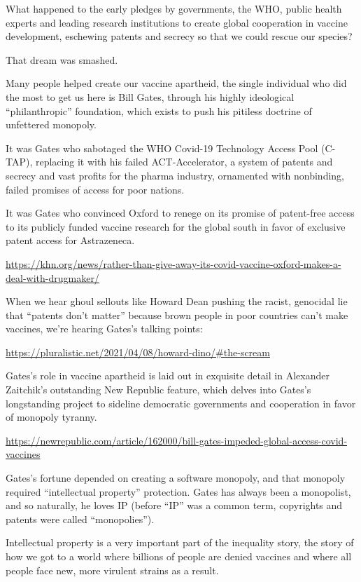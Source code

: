 \documentclass[
]{book}
\begin{document}
What happened to the early pledges by governments, the WHO, public health experts and leading research institutions to create global cooperation in vaccine development, eschewing patents and secrecy so that we could rescue our species?

That dream was smashed.

Many people helped create our vaccine apartheid, the single individual who did the most to get us here is Bill Gates, through his highly ideological ``philanthropic'' foundation, which exists to push his pitiless doctrine of unfettered monopoly.

It was Gates who sabotaged the WHO Covid-19 Technology Access Pool (C-TAP), replacing it with his failed ACT-Accelerator, a system of patents and secrecy and vast profits for the pharma industry, ornamented with nonbinding, failed promises of access for poor nations.

It was Gates who convinced Oxford to renege on its promise of patent-free access to its publicly funded vaccine research for the global south in favor of exclusive patent access for Astrazeneca.

\url{https://khn.org/news/rather-than-give-away-its-covid-vaccine-oxford-makes-a-deal-with-drugmaker/}

When we hear ghoul sellouts like Howard Dean pushing the racist, genocidal lie that ``patents don't matter'' because brown people in poor countries can't make vaccines, we're hearing Gates's talking points:

\url{https://pluralistic.net/2021/04/08/howard-dino/\#the-scream}

Gates's role in vaccine apartheid is laid out in exquisite detail in Alexander Zaitchik's outstanding New Republic feature, which delves into Gates's longstanding project to sideline democratic governments and cooperation in favor of monopoly tyranny.

\url{https://newrepublic.com/article/162000/bill-gates-impeded-global-access-covid-vaccines}

Gates's fortune depended on creating a software monopoly, and that monopoly required ``intellectual property'' protection. Gates has always been a monopolist, and so naturally, he loves IP (before ``IP'' was a common term, copyrights and patents were called ``monopolies'').

Intellectual property is a very important part of the inequality story, the story of how we got to a world where billions of people are denied vaccines and where all people face new, more virulent strains as a result.
\end{document}
